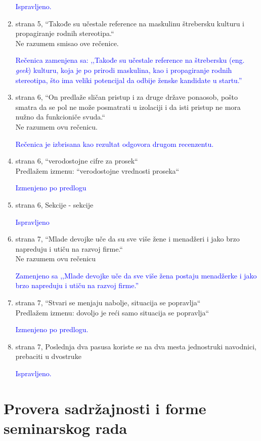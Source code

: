 \documentclass[a4paper]{report}
\newcommand{\odgovor}[1]{\textcolor{blue}{#1}}
\begin{document}
\begin{enumerate}
\odgovor{Ispravljeno.}
\item
strana 5, “Takođe su učestale reference na maskulinu štrebersku kulturu i propagiranje rodnih stereotipa.“  \\
Ne razumem smisao ove rečenice.

\odgovor{Rečenica zamenjena sa: ,,Takođe su učestale reference na štrebersku (eng. \emph{geek}) kulturu, koja je po prirodi maskulina, kao i propagiranje rodnih stereotipa, što ima veliki potencijal da odbije ženske kandidate u startu.''}
\item
strana 6, “On predlaže sličan pristup i za druge države ponaosob, pošto
smatra da se pol ne može posmatrati u izolaciji i da isti pristup ne mora
nužno da funkcioniče svuda.“   \\
Ne razumem ovu rečenicu.

\odgovor{Rečenica je izbrisana kao rezultat odgovora drugom recenzentu.}
\item
strana 6, “verodostojne cifre za prosek“  \\  
Predlažem izmenu: “verodostojne vrednosti proseka“

\odgovor{Izmenjeno po predlogu}
\item
strana 6, Sekcije - sekcije

\odgovor{Ispravljeno}
\item
strana 7, “Mlade devojke uče da su sve više žene i menadžeri i jako brzo napreduju i utiču na razvoj firme.“ \\   
Ne razumem ovu rečenicu

\odgovor{Zamenjeno sa ,,Mlade devojke uče da sve više žena postaju menadžerke i jako brzo napreduju i utiču na razvoj firme.''}
\item
strana 7, “Stvari se menjaju nabolje, situacija se popravlja“ \\  
Predlažem izmenu: dovoljo je reći samo situacija se popravlja“

\odgovor{Izmenjeno po predlogu.}
\item
strana 7, Poslednja dva pasusa koriste se na dva mesta jednostruki navodnici, prebaciti u dvostruke

\odgovor{Ispravljeno.}
\end{enumerate}


\section{Provera sadržajnosti i forme seminarskog rada}
\end{document}
